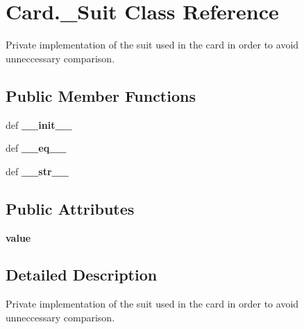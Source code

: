 \hypertarget{classCard_1_1__Suit}{\section{Card.\-\_\-\-Suit Class Reference}
\label{classCard_1_1__Suit}
}


Private implementation of the suit used in the card in order to avoid unneccessary comparison.  


\subsection*{Public Member Functions}
\begin{DoxyCompactItemize}
\item 
\hypertarget{classCard_1_1__Suit_a641e31bf474f01eb83d7e059434c9e70}{def {\bfseries \-\_\-\-\_\-init\-\_\-\-\_\-}}\label{classCard_1_1__Suit_a641e31bf474f01eb83d7e059434c9e70}

\item 
\hypertarget{classCard_1_1__Suit_a11d9b395b371d650bca8b41f348bfb6e}{def {\bfseries \-\_\-\-\_\-eq\-\_\-\-\_\-}}\label{classCard_1_1__Suit_a11d9b395b371d650bca8b41f348bfb6e}

\item 
\hypertarget{classCard_1_1__Suit_acea540d2045d2f501732e9fe3e90fcb2}{def {\bfseries \-\_\-\-\_\-str\-\_\-\-\_\-}}\label{classCard_1_1__Suit_acea540d2045d2f501732e9fe3e90fcb2}

\end{DoxyCompactItemize}
\subsection*{Public Attributes}
\begin{DoxyCompactItemize}
\item 
\hypertarget{classCard_1_1__Suit_a226178ed03847b6e3e7ab52bffdef6e1}{{\bfseries value}}\label{classCard_1_1__Suit_a226178ed03847b6e3e7ab52bffdef6e1}

\end{DoxyCompactItemize}


\subsection{Detailed Description}
Private implementation of the suit used in the card in order to avoid unneccessary comparison. 